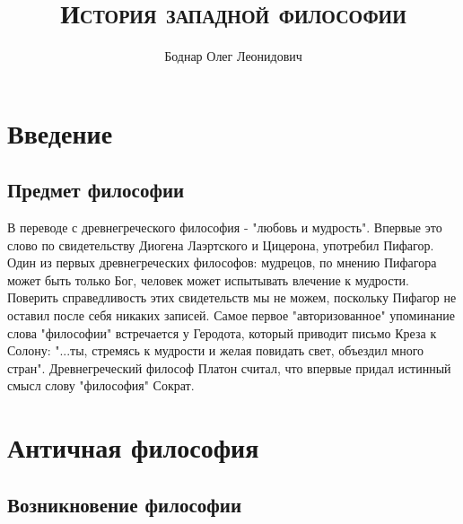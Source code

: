 

\setmainfont{Times New Roman}

\title{\textbf{\textsc{История западной философии}}}
\author{Боднар Олег Леонидович}
\date{} %
\linespread{1.3} %


	
	\maketitle %
	\thispagestyle{empty} %
	\clearpage %
	\setcounter{page}{1} %
		
	\tableofcontents
	\clearpage
	\section{Введение}
	\subsection{Предмет философии}
	
	\par В переводе с древнегреческого философия - "любовь и мудрость". Впервые это слово по свидетельству Диогена Лаэртского и Цицерона,  
	употребил Пифагор. Один из первых древнегреческих философов: мудрецов, по мнению Пифагора может быть только Бог, человек может испытывать влечение к мудрости. Поверить справедливость этих свидетельств мы не можем, поскольку Пифагор не оставил после себя никаких записей.  Самое первое "авторизованное" упоминание слова "философии" встречается у Геродота, который приводит письмо Креза к Солону: "...ты, стремясь к мудрости и желая повидать свет, объездил много стран". Древнегреческий философ Платон считал, что впервые придал истинный смысл слову "философия" Сократ. 
	\clearpage
	
	\section{Античная философия}
	
	\subsection{Возникновение философии}

